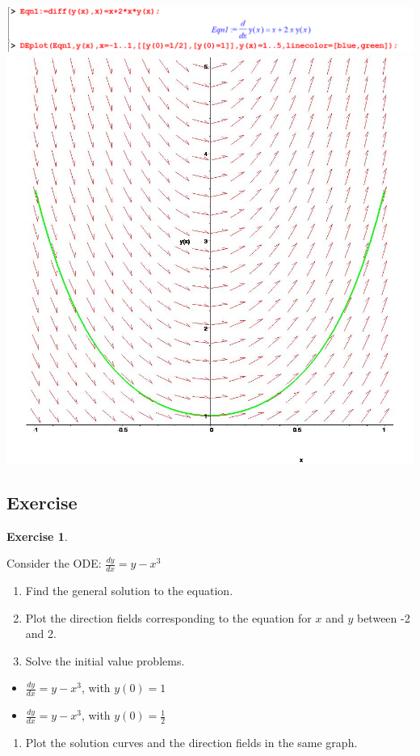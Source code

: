 \documentclass[
]{book}
\providecommand{\tightlist}{%
  \setlength{\itemsep}{0pt}\setlength{\parskip}{0pt}}
\theoremstyle{definition}
\theoremstyle{definition}
\theoremstyle{definition}
\newtheorem{exercise}{Exercise}[chapter]
\theoremstyle{definition}
\theoremstyle{remark}
\begin{document}
\includegraphics{figures/Diff/Diff 6.2 -14.png}
\includegraphics{figures/Diff/Diff 6.2 -14.jpg}

\subsection{Exercise}\label{exercise-6}

\begin{exercise}
\protect\hypertarget{exr:unnamed-chunk-37}{}\label{exr:unnamed-chunk-37}

Consider the ODE: \(\frac{dy}{dx} = y - x^3\)

\begin{enumerate}
\def\labelenumi{(\alph{enumi})}
\tightlist
\item
  Find the general solution to the equation.
\item
  Plot the direction fields corresponding to the equation for \(x\) and \(y\) between -2 and 2.
\item
  Solve the initial value problems.
\end{enumerate}

\begin{itemize}
\tightlist
\item
  \(\frac{dy}{dx} = y - x^3\), with \(y(0) = {1}\)
\item
  \(\frac{dy}{dx} = y - x^3\), with \(y(0) = \frac{1}{2}\)
\end{itemize}

\begin{enumerate}
\def\labelenumi{(\alph{enumi})}
\setcounter{enumi}{3}
\tightlist
\item
  Plot the solution curves and the direction fields in the same graph.
\end{enumerate}

\end{exercise}
\end{document}

